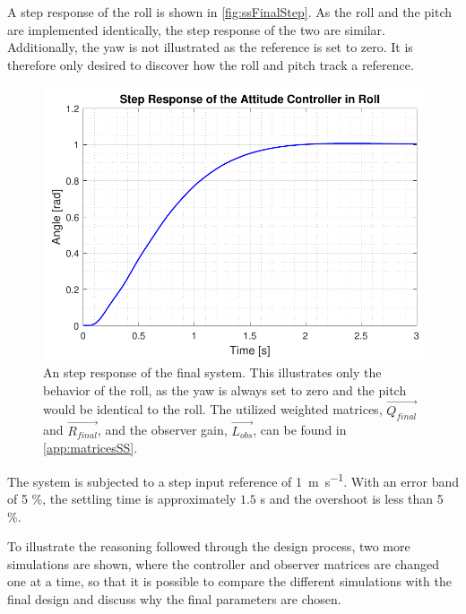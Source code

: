 A step response of the roll is shown in \autoref{fig:ssFinalStep}. As the roll and the pitch are implemented identically, the step response of the two are similar. Additionally, the yaw is not illustrated as the reference is set to zero. It is therefore only desired to discover how the roll and pitch track a reference. 
%
\begin{figure}[H]
	\centering
	\includegraphics[scale=0.7]{figures/ssFinalStep.pdf}
	\caption{An step response of the final system. This illustrates only the behavior of the roll, as the yaw is always set to zero and the pitch would be identical to the roll. The utilized weighted matrices, $\vec{Q_{final}}$ and $\vec{R_{final}}$, and the observer gain, $\vec{L_{obs}}$, can be found in \autoref{app:matricesSS}.}
	\label{fig:ssFinalStep}
\end{figure}
%
The system is subjected to a step input reference of \SI{1}{m s^{-1}}. With an error band of 5 \%, the settling time is approximately $1.5$ s and the overshoot is less than 5 \%.

To illustrate the reasoning followed through the design process, two more simulations are shown, where the controller and observer matrices are changed one at a time, so that it is possible to compare the different simulations with the final design and discuss why the final parameters are chosen.

